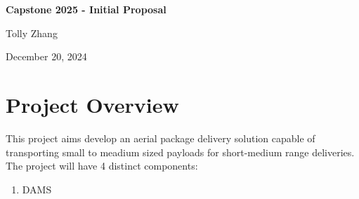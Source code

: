 \documentclass[12pt]{article}
\begin{document}
\begin{titlepage}
    \centering
    \vfill
    \vspace*{2.5in}
    {\Huge\bfseries Capstone 2025 - Initial Proposal \par}
    \vspace{0.2in}
    {\LARGE Tolly Zhang \par}    
    \vspace{0.2in}
    {\LARGE December 20, 2024 \par}
    \vfill
\end{titlepage}

\newpage
\section*{Project Overview}
This project aims develop an aerial package delivery solution capable of transporting small to meadium sized payloads for short-medium range deliveries. The project will have 4 distinct components:
\begin{enumerate}
    \item DAMS 
\end{enumerate}
\end{document}
